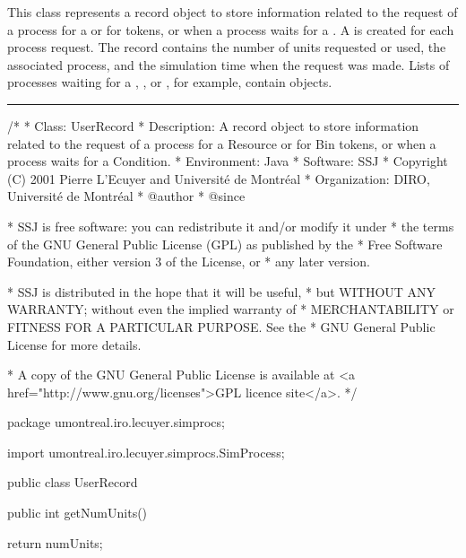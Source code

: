 
This class represents a record object to store 
information related to the request of a process for a
 or for  tokens, 
or when a process waits for a .
A  is created for each process request.
The record contains the number of units requested 
or used, the associated process, and the
simulation time when the request was made.
Lists of processes waiting for a ,
, or , for example, contain
 objects.


\bigskip\hrule

\begin{code}
\begin{hide}
/*
 * Class:        UserRecord
 * Description:  A record object to store information related to the request
                 of a process for a Resource or for Bin tokens, or when a 
                 process waits for a Condition.
 * Environment:  Java
 * Software:     SSJ 
 * Copyright (C) 2001  Pierre L'Ecuyer and Université de Montréal
 * Organization: DIRO, Université de Montréal
 * @author       
 * @since

 * SSJ is free software: you can redistribute it and/or modify it under
 * the terms of the GNU General Public License (GPL) as published by the
 * Free Software Foundation, either version 3 of the License, or
 * any later version.

 * SSJ is distributed in the hope that it will be useful,
 * but WITHOUT ANY WARRANTY; without even the implied warranty of
 * MERCHANTABILITY or FITNESS FOR A PARTICULAR PURPOSE.  See the
 * GNU General Public License for more details.

 * A copy of the GNU General Public License is available at
   <a href="http://www.gnu.org/licenses">GPL licence site</a>.
 */
\end{hide}
package umontreal.iro.lecuyer.simprocs;\begin{hide}

import umontreal.iro.lecuyer.simprocs.SimProcess;
\end{hide}

public class UserRecord \begin{hide} {
   // Nb. of units taken for this record.
   protected int numUnits;

   // Process associated to the record
   protected SimProcess process;

   // Priority of this process.
   // protected double priority;

   // Time of the record creation
   protected double requestTime;

   // Constructor.
   // We do not want the user to construct such objects.
   protected UserRecord (int n, SimProcess p, double requestTime) {
      numUnits = n;
      process = p;
      this.requestTime = requestTime;
   }\end{hide}

   public int getNumUnits()\begin{hide} {
      return numUnits;
   }\end{hide}
\end{code}
